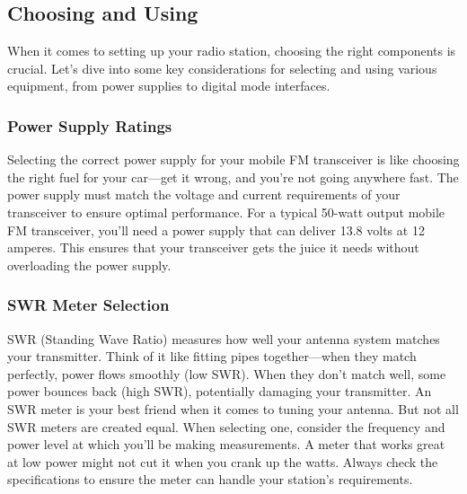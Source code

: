 \subsection{Choosing and Using}
\label{subsec:psu-choice}

When it comes to setting up your radio station, choosing the right components is crucial. Let's dive into some key considerations for selecting and using various equipment, from power supplies to digital mode interfaces.

\subsubsection*{Power Supply Ratings}
Selecting the correct power supply for your mobile FM transceiver is like choosing the right fuel for your car—get it wrong, and you're not going anywhere fast. The power supply must match the voltage and current requirements of your transceiver to ensure optimal performance. For a typical 50-watt output mobile FM transceiver, you'll need a power supply that can deliver 13.8 volts at 12 amperes. This ensures that your transceiver gets the juice it needs without overloading the power supply.

\subsubsection*{SWR Meter Selection}
SWR (Standing Wave Ratio) measures how well your antenna system matches your transmitter. Think of it like fitting pipes together—when they match perfectly, power flows smoothly (low SWR). When they don't match well, some power bounces back (high SWR), potentially damaging your transmitter. An SWR meter is your best friend when it comes to tuning your antenna. But not all SWR meters are created equal. When selecting one, consider the frequency and power level at which you'll be making measurements. A meter that works great at low power might not cut it when you crank up the watts. Always check the specifications to ensure the meter can handle your station's requirements.

